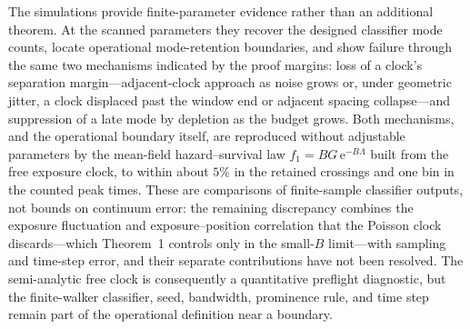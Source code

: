 \documentclass[aps,physrev,reprint,amsmath,amssymb,longbibliography,floatfix]{revtex4-2}
\newcommand{\e}{\mathrm e}
\begin{document}
The simulations provide finite-parameter evidence rather than an additional
theorem.  At the scanned parameters they recover the designed classifier mode
counts, locate operational mode-retention boundaries, and show failure
through the same two mechanisms indicated by the proof margins: loss of a
clock's separation margin---adjacent-clock approach as noise grows or,
under geometric jitter, a clock displaced past the window end or adjacent
spacing collapse---and suppression of a late mode by depletion as the budget
grows.  Both mechanisms, and the
operational boundary itself, are reproduced without adjustable parameters by
the mean-field hazard--survival law \(f_1=BG\,\e^{-B\Lambda}\) built from
the free exposure clock, to within about \(5\%\) in the retained crossings and one
bin in the counted peak times.  These are comparisons of finite-sample
classifier outputs, not bounds on continuum error: the remaining
discrepancy combines the exposure fluctuation and exposure--position
correlation that the Poisson clock discards---which Theorem~1 controls
only in the small-\(B\) limit---with sampling and time-step error, and
their separate contributions have not been resolved.  The semi-analytic free clock is
consequently a quantitative preflight diagnostic, but the finite-walker
classifier, seed, bandwidth, prominence rule, and time step remain part of
the operational definition near a boundary.
\end{document}
